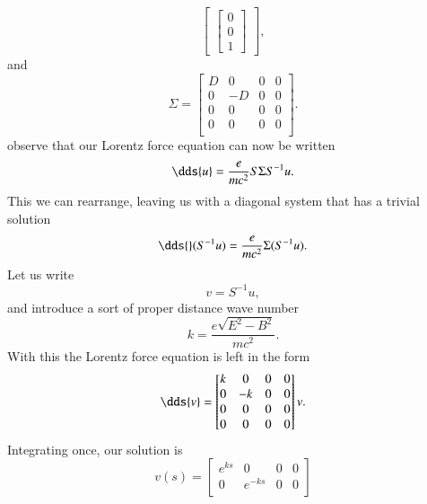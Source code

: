 {\begin{equation}
\begin{bmatrix}
\begin{bmatrix}
0 \\
0 \\
1
\end{bmatrix}
\end{bmatrix},
\end{equation}
%
and
%
\begin{equation}\label{eqn:relElectroDynProblemSet2:730}
\Sigma =
\begin{bmatrix}
D & 0 & 0 & 0 \\
0 & -D & 0 & 0 \\
0 & 0 & 0 & 0 \\
0 & 0 & 0 & 0 \\
\end{bmatrix}.
\end{equation}
%
observe that our Lorentz force equation can now be written
%
\begin{equation}\label{eqn:relElectroDynProblemSet2:750}
\dds{u} = \frac{e}{m c^2} S \Sigma S^{-1} u.
\end{equation}
%
This we can rearrange, leaving us with a diagonal system that has a trivial solution
%
\begin{equation}\label{eqn:relElectroDynProblemSet2:770}
\dds{} (S^{-1} u) = \frac{e}{m c^2} \Sigma (S^{-1} u).
\end{equation}
%
Let us write
%
\begin{equation}\label{eqn:relElectroDynProblemSet2:790}
v = S^{-1} u,
\end{equation}
%
and introduce a sort of proper distance wave number
%
\begin{equation}\label{eqn:relElectroDynProblemSet2:810}
k = \frac{e \sqrt{E^2 - B^2}}{m c^2}.
\end{equation}
%
With this the Lorentz force equation is left in the form
%
\begin{equation}\label{eqn:relElectroDynProblemSet2:830}
\dds{v} =
\begin{bmatrix}
k & 0 & 0 & 0 \\
0 & -k & 0 & 0 \\
0 & 0 & 0 & 0 \\
0 & 0 & 0 & 0 \\
\end{bmatrix} v.
\end{equation}
%
Integrating once, our solution is
%
\begin{equation}\label{eqn:relElectroDynProblemSet2:850}
v(s) =
\begin{bmatrix}
e^{ks} & 0 & 0 & 0 \\
0 & e^{-ks} & 0 & 0 \\

\end{bmatrix}
\end{equation}}
